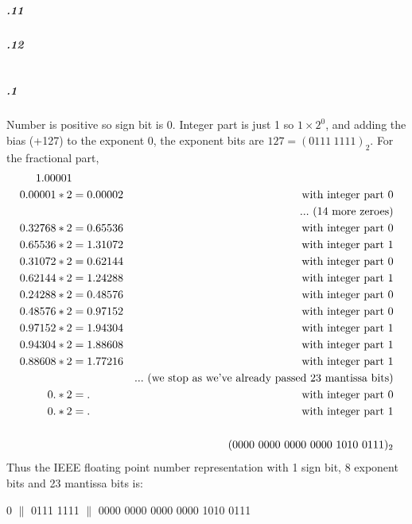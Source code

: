 \documentclass[11pt,letterpaper]{article}
\begin{document}
		\subparagraph{.11}
		
		\subparagraph{.12}
		
	\section{}
	
		\subparagraph{.1}
		Number is positive so sign bit is 0.
		Integer part is just 1 so $1 \times 2^0$, and adding the bias (+127) to the exponent 0, the exponent bits are $127 = (0111\ 1111)_{2}$.
		For the fractional part,
		\begin{align*}
		1.00001\\
		0.00001 * 2 &= 0.00002&\textnormal{with integer part 0}\\
		&&...\textnormal{ (14 more zeroes)}\\
		0.32768 * 2 &= 0.65536&\textnormal{with integer part 0}\\
		0.65536 * 2 &= 1.31072&\textnormal{with integer part 1}\\
		0.31072 * 2 &= 0.62144&\textnormal{with integer part 0}\\
		0.62144 * 2 &= 1.24288&\textnormal{with integer part 1}\\
		0.24288 * 2 &= 0.48576&\textnormal{with integer part 0}\\
		0.48576 * 2 &= 0.97152&\textnormal{with integer part 0}\\
		0.97152 * 2 &= 1.94304&\textnormal{with integer part 1}\\
		0.94304 * 2 &= 1.88608&\textnormal{with integer part 1}\\
		0.88608 * 2 &= 1.77216&\textnormal{with integer part 1}\\
		&&...\textnormal{ (we stop as we've already passed 23 mantissa bits)}\\
		0. * 2 &= .&\textnormal{with integer part 0}\\
		0. * 2 &= .&\textnormal{with integer part 1}\\
		\\
		&&(0000\ 0000\ 0000\ 0000\ 1010\ 0111)_2
		\end{align*}
		Thus the IEEE floating point number representation with 1 sign bit, 8 exponent bits and 23 mantissa bits is:
		\begin{center}
		0 $\|$ 0111 1111 $\|$ 0000 0000 0000 0000 1010 0111
		\end{center}
		
\end{document}
